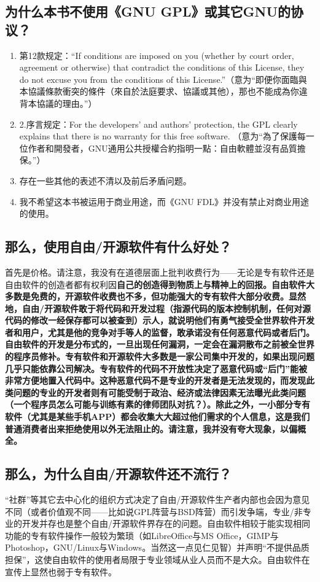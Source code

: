 \subsection{为什么本书不使用《GNU GPL》或其它GNU的协议？}
\begin{enumerate}
	\item 第12款规定：“If conditions are imposed on you (whether by court order, agreement or otherwise) that contradict the conditions of this License, they do not excuse you from the conditions of this License.”（意为“即便你面臨與本協議條款衝突的條件（來自於法庭要求、協議或其他），那也不能成為你違背本協議的理由。”）
	\item 2.序言规定：For the developers' and authors' protection, the GPL clearly explains that there is no warranty for this free software. （意为“為了保護每一位作者和開發者，GNU通用公共授權合約指明一點：自由軟體並沒有品質擔保。”）
	\item 存在一些其他的表述不清以及前后矛盾问题。
	\item 我不希望这本书被运用于商业用途，而《GNU FDL》并没有禁止对商业用途的使用。
\end{enumerate}
\subsection{那么，使用自由/开源软件有什么好处？}
首先是价格。请注意，我没有在道德层面上批判收费行为——无论是专有软件还是自由软件的创造者都有权利因\bf 自己的\normalall 创造得到物质上与精神上的回报。自由软件大多数是免费的，开源软件收费也不多，但功能强大的专有软件大部分收费。显然地，自由/开源软件敢于将代码和开发过程（指源代码的版本控制机制，任何对源代码的修改一经保存都可以被查到）示人，就说明他们有勇气接受全世界软件开发者和用户，尤其是他的竞争对手等人的监督，敢承诺没有任何恶意代码或者后门。自由软件的开发是分布式的，一旦出现任何漏洞，一定会在漏洞散布之前被全世界的程序员修补。专有软件和开源软件大多数是一家公司集中开发的，如果出现问题几乎只能依靠公司解决。专有软件的代码不开放性决定了恶意代码或“后门”能被非常方便地置入代码中。这种恶意代码不是专业的开发者是无法发现的，而发现此类问题的专业的开发者则有可能受制于政治、经济或法律因素无法曝光此类问题（一个程序员怎么可能与训练有素的律师团队对抗？）。除此之外，一小部分专有软件（尤其是某些手机APP）都会收集大大超过他们需求的个人信息，这是我们普通消费者出来拒绝使用以外无法阻止的。请注意，我并没有夸大现象，以偏概全。
\subsection{那么，为什么自由/开源软件还不流行？}
“社群”等其它去中心化的组织方式决定了自由/开源软件生产者内部也会因为意见不同（或者价值观不同——比如说GPL阵营与BSD阵营）而引发争端，专业/非专业的开发并存也是整个自由/开源软件界存在的问题。自由软件相较于能实现相同功能的专有软件操作一般较为繁琐（如LibreOffice与MS Office，GIMP与Photoshop，GNU/Linux与Windows。当然这一点见仁见智）并声明“不提供品质担保”，这使自由软件的使用者局限于专业领域从业人员而不是大众。自由软件在宣传上显然也弱于专有软件。